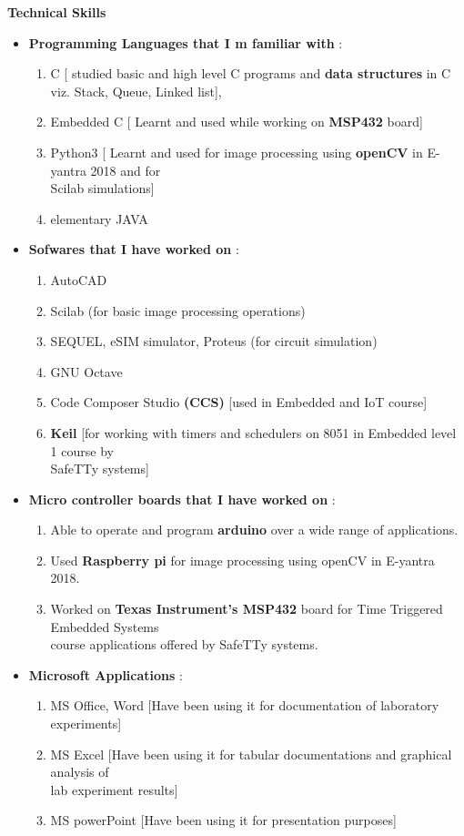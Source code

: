 \documentclass[12pt]{article}
\begin{document}
\begin{flushleft}
\vspace{7mm}
\textbf{Technical Skills}
\begin{itemize}
	\item \textbf{Programming Languages that I m familiar with} : 
	\begin{enumerate}
		\item C [ studied basic and high level C programs and \textbf{data structures} in C viz. Stack, Queue, Linked list],
		\item Embedded C [ Learnt and used while working on \textbf{MSP432} board]
		\item Python3 [ Learnt and used for image processing using \textbf{openCV} in E-yantra 2018 and for \\ Scilab simulations]   
		\item elementary JAVA 
	\end{enumerate} 
	\vspace{5mm}  
	\item \textbf{Sofwares that I have worked on} : 
	\begin{enumerate}
		\item AutoCAD 
		\item Scilab (for basic image processing operations)
		\item SEQUEL, eSIM simulator, Proteus (for circuit simulation)
		\item GNU Octave
		\item Code Composer Studio \textbf{(CCS)} [used in Embedded and IoT course]
		\item \textbf{Keil} [for working with timers and schedulers on 8051 in Embedded level 1 course by \\ SafeTTy systems]
	\end{enumerate}
	\item \textbf{Micro controller boards that I have worked on} :
	\begin{enumerate}
		\item Able to operate and program \textbf{arduino} over a wide range of applications.
		\item Used \textbf{Raspberry pi} for image processing using openCV in E-yantra 2018.
		\item Worked on \textbf{Texas Instrument's MSP432} board for Time Triggered Embedded Systems \\course applications offered by SafeTTy systems.
	\end{enumerate}
	\vspace{10mm}
	\item \textbf{Microsoft Applications }:
	\begin{enumerate}
		\item MS Office, Word [Have been using it for documentation of laboratory experiments]
		\item MS Excel [Have been using it for tabular documentations and graphical analysis of\\ lab experiment results]
		\item MS powerPoint [Have been using it for presentation purposes]
		

\end{enumerate}
\end{itemize}
\end{flushleft}
\end{document}
